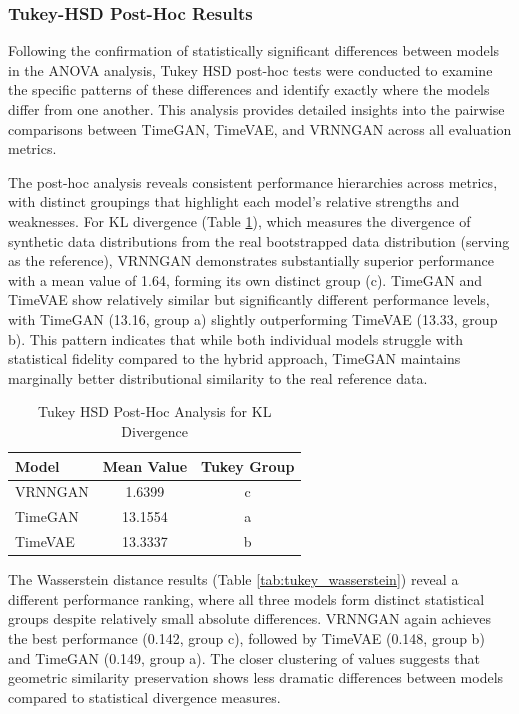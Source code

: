 \documentclass{article}
\begin{document}
\subsubsection{Tukey-HSD Post-Hoc Results}

Following the confirmation of statistically significant differences between models in the ANOVA analysis, Tukey HSD post-hoc tests were conducted to examine the specific patterns of these differences and identify exactly where the models differ from one another. This analysis provides detailed insights into the pairwise comparisons between TimeGAN, TimeVAE, and VRNNGAN across all evaluation metrics.

The post-hoc analysis reveals consistent performance hierarchies across metrics, with distinct groupings that highlight each model's relative strengths and weaknesses. For KL divergence (Table \ref{tab:tukey_kl}), which measures the divergence of synthetic data distributions from the real bootstrapped data distribution (serving as the reference), VRNNGAN demonstrates substantially superior performance with a mean value of 1.64, forming its own distinct group (c). TimeGAN and TimeVAE show relatively similar but significantly different performance levels, with TimeGAN (13.16, group a) slightly outperforming TimeVAE (13.33, group b). This pattern indicates that while both individual models struggle with statistical fidelity compared to the hybrid approach, TimeGAN maintains marginally better distributional similarity to the real reference data.
\begin{table}[H]
\centering
\caption{Tukey HSD Post-Hoc Analysis for KL Divergence}
\label{tab:tukey_kl}
\begin{tabular}{lcc}
\toprule
\textbf{Model} & \textbf{Mean Value} & \textbf{Tukey Group} \\
\midrule
VRNNGAN & 1.6399 & c \\
TimeGAN & 13.1554 & a \\
TimeVAE & 13.3337 & b \\
\bottomrule
\end{tabular}
\footnotesize
\end{table}

The Wasserstein distance results (Table \ref{tab:tukey_wasserstein}) reveal a different performance ranking, where all three models form distinct statistical groups despite relatively small absolute differences. VRNNGAN again achieves the best performance (0.142, group c), followed by TimeVAE (0.148, group b) and TimeGAN (0.149, group a). The closer clustering of values suggests that geometric similarity preservation shows less dramatic differences between models compared to statistical divergence measures.
\end{document}
